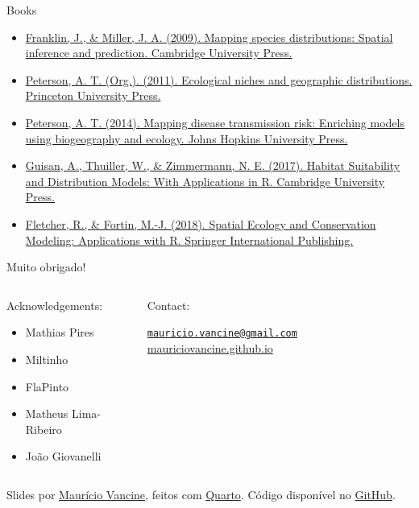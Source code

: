 \documentclass[
  ignorenonframetext,
]{beamer}
\providecommand{\tightlist}{%
  \setlength{\itemsep}{0pt}\setlength{\parskip}{0pt}}\usepackage{longtable,booktabs,array}
\begin{document}
\begin{frame}{Books}
\label{books}
\begin{itemize}
\item
  \href{https://doi.org/10.1017/CBO9780511810602}{Franklin, J., \&
  Miller, J. A. (2009). Mapping species distributions: Spatial inference
  and prediction. Cambridge University Press.}
\item
  \href{https://press.princeton.edu/books/paperback/9780691136882/ecological-niches-and-geographic-distributions-mpb-49}{Peterson,
  A. T. (Org.). (2011). Ecological niches and geographic distributions.
  Princeton University Press.}
\item
  \href{https://jhupbooks.press.jhu.edu/title/mapping-disease-transmission-risk}{Peterson,
  A. T. (2014). Mapping disease transmission risk: Enriching models
  using biogeography and ecology. Johns Hopkins University Press.}
\item
  \href{https://doi.org/10.1017/9781139028271}{Guisan, A., Thuiller, W.,
  \& Zimmermann, N. E. (2017). Habitat Suitability and Distribution
  Models: With Applications in R. Cambridge University Press.}
\item
  \href{https://doi.org/10.1007/978-3-030-01989-1}{Fletcher, R., \&
  Fortin, M.-J. (2018). Spatial Ecology and Conservation Modeling:
  Applications with R. Springer International Publishing.}
\end{itemize}
\end{frame}

\begin{frame}{Muito obrigado!}
\label{muito-obrigado}
\begin{columns}[T]
\begin{column}{0.5\textwidth}
Acknowledgements:

\begin{itemize}
\tightlist
\item
  Mathias Pires
\item
  Miltinho
\item
  FlaPinto
\item
  Matheus Lima-Ribeiro
\item
  João Giovanelli
\end{itemize}
\end{column}

\begin{column}{0.5\textwidth}
Contact:

\href{mailto:mauricio.vancine@gmail.com}{\nolinkurl{mauricio.vancine@gmail.com}}
\href{https://mauriciovancine.github.io}{mauriciovancine.github.io}
\end{column}
\end{columns}

Slides por \href{https://mauriciovancine.github.io/}{Maurício Vancine},
feitos com \href{https://quarto.org/}{Quarto}. Código disponível no
\href{https://github.com/mauriciovancine/workshop-intro-r/blob/master/01_slides/slides.qmd}{GitHub}.
\end{frame}
\end{document}
